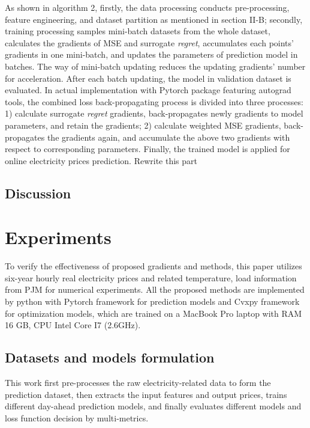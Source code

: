 \documentclass[journal]{IEEEtran}
\newcommand{\slw}{\color{blue}}
\begin{document}
As shown in algorithm 2, firstly, the data processing conducts 
pre-processing, feature engineering, and dataset partition  as mentioned in section II-B; secondly, training processing samples mini-batch datasets from the whole dataset, calculates the gradients of MSE and surrogate \textit{regret}, accumulates each points' gradients in one mini-batch, and updates the parameters of prediction model in batches. The way of mini-batch updating reduces the updating gradients' number for acceleration. After each batch updating, the model in validation dataset is evaluated. In actual implementation with Pytorch package featuring autograd tools, the combined loss back-propagating process is divided into three processes: 1) calculate surrogate \textit{regret} gradients, back-propagates newly gradients to model parameters, and retain the gradients; 2) calculate weighted MSE gradients, back-propagates the  gradients again, and accumulate the above two gradients with respect to corresponding parameters. Finally, the trained model is applied for online electricity prices prediction. {\slw Rewrite this part}

\subsection{Discussion}

\section{Experiments}
To verify the effectiveness of proposed gradients and methods, this paper utilizes six-year hourly real electricity prices and related temperature, load information from PJM for numerical experiments\cite{PJM}. All the proposed methods are implemented by python with Pytorch framework for prediction models and Cvxpy framework for optimization models, which are trained on a MacBook Pro laptop with RAM 16 GB, CPU Intel Core I7 (2.6GHz).

\subsection{Datasets and models formulation}
This work first pre-processes the raw electricity-related data to form the prediction dataset, then extracts the input features and output prices, trains different day-ahead prediction models, and finally evaluates different models and loss function decision by multi-metrics. 
\end{document}
